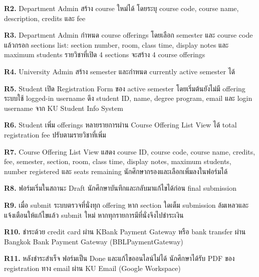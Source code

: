 \textbf{R2.} Department Admin สร้าง course ใหม่ได้ โดยระบุ course code, course name, description, credits และ fee\par\smallskip
\textbf{R3.} Department Admin กำหนด course offerings โดยเลือก semester และ course code แล้วกรอก sections list: section number, room, class time, display notes และ maximum students รายวิชาที่เปิด 4 sections จะสร้าง 4 course offerings\par\smallskip
\textbf{R4.} University Admin สร้าง semester และกำหนด currently active semester ได้\par\smallskip
\textbf{R5.} Student เปิด Registration Form ของ active semester โดยเริ่มต้นยังไม่มี offering ระบบใช้ logged-in username ดึง student ID, name, degree program, email และ login username จาก KU Student Info System\par\smallskip
\textbf{R6.} Student เพิ่ม offerings หลายรายการผ่าน Course Offering List View ได้ total registration fee ปรับตามรายวิชาที่เพิ่ม\par\smallskip
\textbf{R7.} Course Offering List View แสดง course ID, course code, course name, credits, fee, semester, section, room, class time, display notes, maximum students, number registered และ seats remaining นักศึกษากรองและเลือกเพิ่มลงในฟอร์มได้\par\smallskip
\textbf{R8.} ฟอร์มเริ่มในสถานะ Draft นักศึกษาบันทึกและกลับมาแก้ไขได้ก่อน final submission\par\smallskip
\textbf{R9.} เมื่อ submit ระบบตรวจที่นั่งทุก offering หาก section ใดเต็ม submission ล้มเหลวและแจ้งเตือนให้แก้ไขแล้ว submit ใหม่ หากทุกรายการมีที่นั่งจึงไปชำระเงิน\par\smallskip
\textbf{R10.} ชำระด้วย credit card ผ่าน KBank Payment Gateway หรือ bank transfer ผ่าน Bangkok Bank Payment Gateway (BBLPaymentGateway)\par\smallskip
\textbf{R11.} หลังชำระสำเร็จ ฟอร์มเป็น Done และแก้ไขออนไลน์ไม่ได้ นักศึกษาได้รับ PDF ของ registration ทาง email ผ่าน KU Email (Google Workspace)\par\smallskip
\newpage
{}


